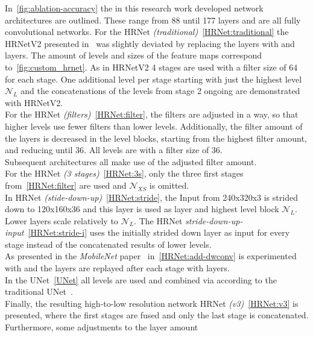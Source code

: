 In~\ref{fig:ablation-accuracy} the in this research work developed network architectures are outlined.
These range from 88 until 177 layers and are
all fully convolutional networks.
For the HRNet \textit{(traditional)}~\ref{HRNet:traditional} the HRNetV2 presented in~\cite{HRNetv2} was slightly
deviated
by replacing the 
layers with  and  layers.
The amount of levels and sizes of the feature maps correspond to~\ref{fig:custom_hrnet}.
As in HRNetV2 4 stages are used with a filter size of 64 for each stage.
One additional level per stage starting with just the highest level $\mathcal{N}_L$
and the concatenations of the levels from stage 2 ongoing are demonstrated with HRNetV2.\\
For the HRNet \textit{(filters)}~\ref{HRNet:filter}, the filters are adjusted in a way, so that higher levels use
fewer filters than lower levels.
Additionally, the filter amount of the  layers is decreased in the level blocks, starting from
the highest filter
amount, and reducing until 36.
All levels are  with a filter size of 36.\\
Subsequent architectures all make use of the adjusted filter amount.\\
For the HRNet \textit{(3 stages)}~\ref{HRNet:3s}, only the three first stages from~\ref{HRNet:filter} are used and
$\mathcal{N}_{XS}$ is omitted.\\
In HRNet \textit{(stide-down-up)}~\ref{HRNet:stride}, the Input from 240x320x3 is strided down to 120x160x36 and this
layer is used as  layer
and highest level block $\mathcal{N}_L$. Lower layers scale relatively to $\mathcal{N}_L$.
The HRNet \textit{stride-down-up-input}~\ref{HRNet:stride-i} uses the initially strided down  layer as
input for
every stage instead of the concatenated results of lower levels.\\
As presented in the \textit{MobileNet} paper~\cite{mobilenet} in~\ref{HRNet:add-dwconv} 
is experimented with
and the  layers are replayed after each stage with  layers.\\
In the UNet~\ref{UNet} all levels are used and combined via  according to the traditional
UNet~\cite{unet}.\\
Finally, the resulting high-to-low resolution network HRNet \textit{(v3)}~\ref{HRNet:v3} is presented, where
the first stages are fused and only the last stage is concatenated. Furthermore, some adjustments to the layer amount
